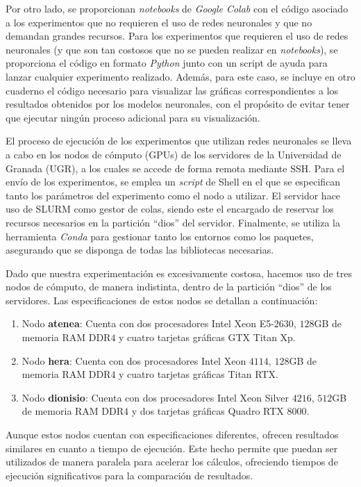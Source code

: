Por otro lado, se proporcionan \textit{notebooks} de \textit{Google Colab} con el código asociado a los experimentos que no requieren el uso de redes neuronales y que no demandan grandes recursos. Para los experimentos que requieren el uso de redes neuronales (y que son tan costosos que no se pueden realizar en \textit{notebooks}), se proporciona el código en formato \textit{Python} junto con un script de ayuda para lanzar cualquier experimento realizado. Además, para este caso, se incluye en otro cuaderno el código necesario para visualizar las gráficas correspondientes a los resultados obtenidos por los modelos neuronales, con el propósito de evitar tener que ejecutar ningún proceso adicional para su visualización.

El proceso de ejecución de los experimentos que utilizan redes neuronales se lleva a cabo en los nodos de cómputo (GPUs) de los servidores de la Universidad de Granada (UGR), a los cuales se accede de forma remota mediante SSH. Para el envío de los experimentos, se emplea un \textit{script} de Shell en el que se especifican tanto los parámetros del experimento como el nodo a utilizar. El servidor hace uso de SLURM como gestor de colas, siendo este el encargado de reservar los recursos necesarios en la partición ``dios'' del servidor. Finalmente, se utiliza la herramienta \textit{Conda} para gestionar tanto los entornos como los paquetes, asegurando que se disponga de todas las bibliotecas necesarias.

Dado que nuestra experimentación es excesivamente costosa, hacemos uso de tres nodos de cómputo, de manera indistinta, dentro de la partición ``dios'' de los servidores. Las especificaciones de estos nodos se detallan a continuación:

\begin{enumerate}
    \item Nodo \textbf{atenea}: Cuenta con dos procesadores Intel Xeon E5-$2630$, $128$GB de memoria RAM DDR$4$ y cuatro tarjetas gráficas GTX Titan Xp.
    \item Nodo \textbf{hera}: Cuenta con dos procesadores Intel Xeon $4114$, $128$GB de memoria RAM DDR$4$ y cuatro tarjetas gráficas Titan RTX.
    \item Nodo \textbf{dionisio}: Cuenta con dos procesadores Intel Xeon Silver $4216$, $512$GB de memoria RAM DDR$4$ y dos tarjetas gráficas Quadro RTX $8000$.
\end{enumerate}

Aunque estos nodos cuentan con especificaciones diferentes, ofrecen resultados similares en cuanto a tiempo de ejecución. Este hecho permite que puedan ser utilizados de manera paralela para acelerar los cálculos, ofreciendo tiempos de ejecución significativos para la comparación de resultados.

